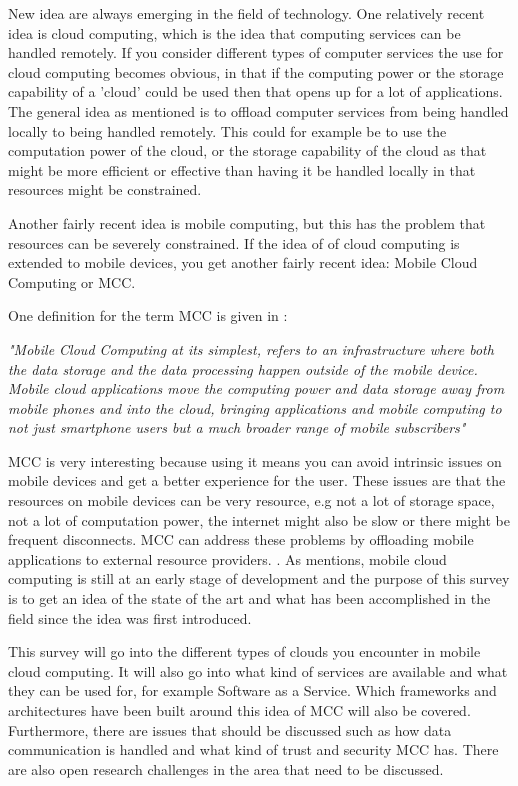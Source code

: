 
New idea are always emerging in the field of technology.
One relatively recent idea is cloud computing, which is the idea that computing services can be handled remotely.
If you consider different types of computer services the use for cloud computing becomes obvious, in that if the computing power or the storage capability of a 'cloud' could be used then that opens up for a lot of applications.
The general idea as mentioned is to offload computer services from being handled locally to being handled remotely. 
This could for example be to use the computation power of the cloud, or the storage capability of the cloud as that might be more efficient or effective than having it be handled locally in that resources might be constrained.

Another fairly recent idea is mobile computing, but this has the problem that resources can be severely constrained. 
If the idea of of cloud computing is extended to mobile devices, you get another fairly recent idea: Mobile Cloud Computing or MCC.

One definition for the term MCC is given in \citet{}:

\textit{"Mobile Cloud Computing at its simplest, refers to an infrastructure where both the data storage and the data processing happen outside of the mobile device. Mobile cloud applications move the computing power and data storage away from mobile phones and into the cloud, bringing applications and mobile computing to not just smartphone users but a much broader range of mobile subscribers"}

MCC is very interesting because using it means you can avoid intrinsic issues on mobile devices and get a better experience for the user. 
These issues are that the resources on mobile devices can be very resource, e.g not a lot of storage space, not a lot of computation power, the internet might also be slow or there might be frequent disconnects.
MCC can address these problems by offloading mobile applications to external resource providers. \citet{}. %
As \citet{} mentions, mobile cloud computing is still at an early stage of development and the purpose of this survey is to get an idea of the state of the art and what has been accomplished in the field since the idea was first introduced. %

This survey will go into the different types of clouds you encounter in mobile cloud computing.
It will also go into what kind of services are available and what they can be used for, for example Software as a Service.
Which frameworks and architectures have been built around this idea of MCC will also be covered. 
Furthermore, there are issues that should be discussed such as how data communication is handled and what kind of trust and security MCC has. 
There are also open research challenges in the area that need to be discussed. 
